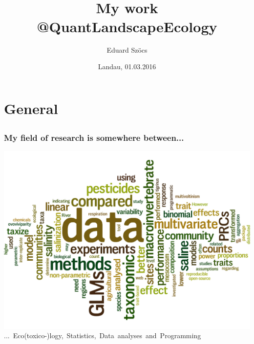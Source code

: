 \documentclass[12pt, t]{beamer}
\title{My work @QuantLandscapeEcology}
\author{Eduard Szöcs}
\institute{Institute for Environmental Sciences, University of Koblenz-Landau}
\date{Landau, 01.03.2016}
\begin{document}
\begin{frame}
\titlepage
\end{frame}


\section{General} 
\subsection{}
\begin{frame}
\frametitle{My field of research is somewhere between...}
\center
\includegraphics[width =.8\textwidth]{fig/wordcloud_abstracts_firstauthor.png} \\	
\mbox{... Eco(toxico-)logy, Statistics, Data analyses and Programming}
\end{frame}
\end{document}
